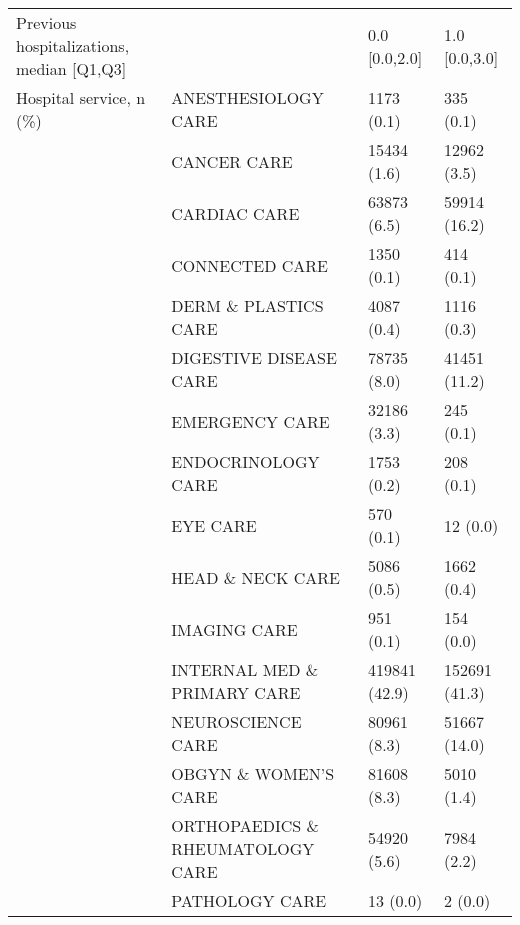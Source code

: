 \begin{tabular}{llll}
Previous hospitalizations, median [Q1,Q3] &   &                         0.0 [0.0,2.0] &     1.0 [0.0,3.0] \\
Hospital service, n (\%) & ANESTHESIOLOGY CARE &                            1173 (0.1) &         335 (0.1) \\
                                       & CANCER CARE &                           15434 (1.6) &       12962 (3.5) \\
                                       & CARDIAC CARE &                           63873 (6.5) &      59914 (16.2) \\
                                       & CONNECTED CARE &                            1350 (0.1) &         414 (0.1) \\
                                       & DERM \& PLASTICS CARE &                            4087 (0.4) &        1116 (0.3) \\
                                       & DIGESTIVE DISEASE CARE &                           78735 (8.0) &      41451 (11.2) \\
                                       & EMERGENCY CARE &                           32186 (3.3) &         245 (0.1) \\
                                       & ENDOCRINOLOGY CARE &                            1753 (0.2) &         208 (0.1) \\
                                       & EYE CARE &                             570 (0.1) &          12 (0.0) \\
                                       & HEAD \& NECK CARE &                            5086 (0.5) &        1662 (0.4) \\
                                       & IMAGING CARE &                             951 (0.1) &         154 (0.0) \\
                                       & INTERNAL MED \& PRIMARY CARE &                         419841 (42.9) &     152691 (41.3) \\
                                       & NEUROSCIENCE CARE &                           80961 (8.3) &      51667 (14.0) \\
                                       & OBGYN \& WOMEN'S CARE &                           81608 (8.3) &        5010 (1.4) \\
                                       & ORTHOPAEDICS \& RHEUMATOLOGY CARE &                           54920 (5.6) &        7984 (2.2) \\
                                       & PATHOLOGY CARE &                              13 (0.0) &           2 (0.0) \\

\end{tabular}
